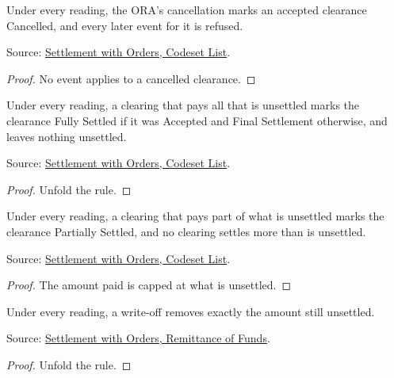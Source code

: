\begin{theorem}
  \label{thm:accounting-cancel-clearance}
  Under every reading, the ORA's cancellation marks an accepted clearance
  Cancelled, and every later event for it is refused.

  Source: \href{https://standards.atlassian.net/wiki/spaces/SWO/pages/574456090}{Settlement with Orders, Codeset List}.
\end{theorem}
\begin{proof}
  No event applies to a cancelled clearance.
\end{proof}

\begin{theorem}
  \label{thm:accounting-settle-all}
  Under every reading, a clearing that pays all that is unsettled marks the
  clearance Fully Settled if it was Accepted and Final Settlement
  otherwise, and leaves nothing unsettled.

  Source: \href{https://standards.atlassian.net/wiki/spaces/SWO/pages/574456090}{Settlement with Orders, Codeset List}.
\end{theorem}
\begin{proof}
  Unfold the rule.
\end{proof}

\begin{theorem}
  \label{thm:accounting-settle-part}
  Under every reading, a clearing that pays part of what is unsettled
  marks the clearance Partially Settled, and no clearing settles more than
  is unsettled.

  Source: \href{https://standards.atlassian.net/wiki/spaces/SWO/pages/574456090}{Settlement with Orders, Codeset List}.
\end{theorem}
\begin{proof}
  The amount paid is capped at what is unsettled.
\end{proof}

\begin{theorem}
  \label{thm:accounting-write-off}
  Under every reading, a write-off removes exactly the amount still
  unsettled.

  Source: \href{https://standards.atlassian.net/wiki/spaces/SWO/pages/574718145}{Settlement with Orders, Remittance of Funds}.
\end{theorem}
\begin{proof}
  Unfold the rule.
\end{proof}

